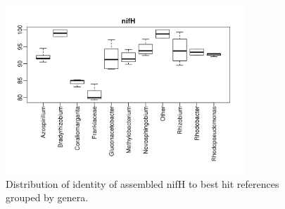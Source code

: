 \documentclass[12pt]{article}
\begin{document}
    \begin{figure}[tbph!]
    \centering
    \includegraphics[width=0.8\textwidth]{figures/xander-nifH-genus-similarity}
    \caption[Distribution of identity of assembled nifH to references]{Distribution of identity of assembled nifH to best hit references grouped by genera.}
    \label{fig:xander-nifH-genus-similarity}
    \end{figure}
    
\end{document}
